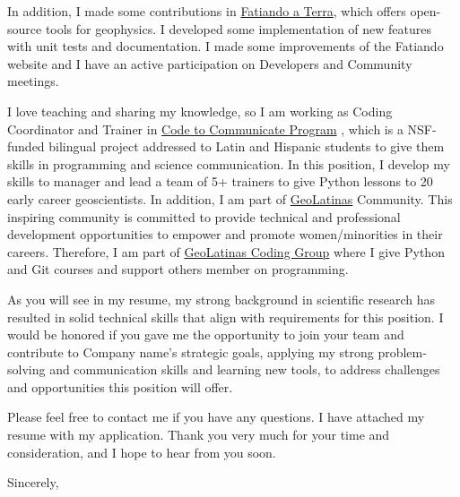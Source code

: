 \documentclass[a4paper]{letter}
\newcommand{\coco}{%
    \href{https://www.codecommunicate.org/}{Code to Communicate Program}%
}
\newcommand{\fatiando}{\href{https://www.fatiando.org/}{Fatiando a Terra}}
\newcommand{\geolatinas}{\href{https://geolatinas.org/}{GeoLatinas}}
\newcommand{\geolatinascoding}{
    \href{https://geolatinas.github.io/}{GeoLatinas Coding Group}
}
\newcommand{\company}{Company name}
\begin{document}
\begin{letter}{}
    In addition, I made some contributions in \fatiando{}, which offers
    open-source tools for geophysics.
    I developed some implementation of new features with unit tests and
    documentation.
    I made some improvements of the Fatiando website and I have an active
    participation on Developers and Community meetings.

    I love teaching and sharing my knowledge, so I am working as Coding
    Coordinator and Trainer in \coco, which is a NSF-funded bilingual project
    addressed to Latin and Hispanic students to give them skills in programming
    and science communication.
    In this position, I develop my skills to manager and lead a team of 5+
    trainers to give Python lessons to 20 early career geoscientists.
    In addition, I am part of \geolatinas{} Community.
    This inspiring community is committed to provide technical and
    professional development opportunities to empower and promote
    women/minorities in their careers.
    Therefore, I am part of \geolatinascoding{} where I give Python and Git
    courses and support others member on programming.

    As you will see in my resume, my strong background in scientific research
    has resulted in solid technical skills that align with requirements for
    this position.
    I would be honored if you gave me the opportunity to join your team and
    contribute to \company's strategic goals, applying my strong
    problem-solving and communication skills and learning new tools, to address
    challenges and opportunities this position will offer.

    Please feel free to contact me if you have any questions.
    I have attached my resume with my application.
    Thank you very much for your time and consideration, and I hope to hear
    from you soon.

\closing{Sincerely,}

\end{letter}
\end{document}

